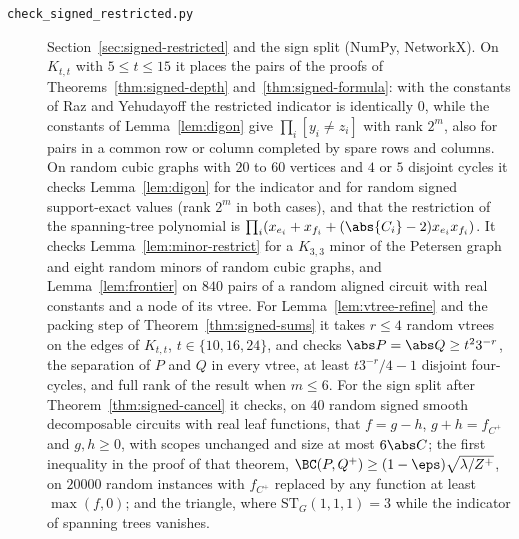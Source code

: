 \begin{description}
\item[\texttt{check\_signed\_restricted.py}] Section~\ref{sec:signed-restricted} and the sign split (NumPy, NetworkX). On $K_{t,t}$ with $5\le t\le15$ it places the pairs of the proofs of Theorems~\ref{thm:signed-depth} and~\ref{thm:signed-formula}: with the constants of Raz and Yehudayoff the restricted indicator is identically $0$, while the constants of Lemma~\ref{lem:digon} give $\prod_i[y_i\ne z_i]$ with rank $2^m$, also for pairs in a common row or column completed by spare rows and columns. On random cubic graphs with $20$ to $60$ vertices and $4$ or $5$ disjoint cycles it checks Lemma~\ref{lem:digon} for the indicator and for random signed support-exact values (rank $2^m$ in both cases), and that the restriction of the spanning-tree polynomial is $\prod_i(x_{e_i}+x_{f_i}+(\abs{C_i}-2)x_{e_i}x_{f_i})$. It checks Lemma~\ref{lem:minor-restrict} for a $K_{3,3}$ minor of the Petersen graph and eight random minors of random cubic graphs, and Lemma~\ref{lem:frontier} on $840$ pairs of a random aligned circuit with real constants and a node of its vtree. For Lemma~\ref{lem:vtree-refine} and the packing step of Theorem~\ref{thm:signed-sums} it takes $r\le4$ random vtrees on the edges of $K_{t,t}$, $t\in\{10,16,24\}$, and checks $\abs P=\abs Q\ge t^23^{-r}$, the separation of $P$ and $Q$ in every vtree, at least $t3^{-r}/4-1$ disjoint four-cycles, and full rank of the result when $m\le6$. For the sign split after Theorem~\ref{thm:signed-cancel} it checks, on $40$ random signed smooth decomposable circuits with real leaf functions, that $f=g-h$, $g+h=f_{C^+}$ and $g,h\ge0$, with scopes unchanged and size at most $6\abs C$; the first inequality in the proof of that theorem, $\BC(P,Q^+)\ge(1-\eps)\sqrt{\lambda/Z^+}$, on $20000$ random instances with $f_{C^+}$ replaced by any function at least $\max(f,0)$; and the triangle, where $\mathrm{ST}_G(1,1,1)=3$ while the indicator of spanning trees vanishes.


\end{description}
